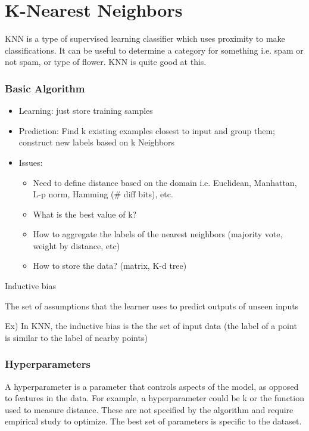 \chapter{K-Nearest Neighbors}
 KNN is a type of supervised learning classifier which uses proximity to make classifications. It can be useful to determine a category for something i.e. spam or not spam, or type of flower. KNN is quite good at this.

 \subsection*{Basic Algorithm}
\begin{itemize}
    \item Learning: just store training samples
    \item Prediction: Find k existing examples closest to input and group them; construct new labels based on k Neighbors
    \item Issues:
    \begin{itemize}
        \item Need to define distance based on the domain i.e. Euclidean, Manhattan, L-p norm, Hamming (\# diff bits), etc.
        \item What is the best value of k?
        \item How to aggregate the labels of the nearest neighbors (majority vote, weight by distance, etc)
        \item How to store the data? (matrix, K-d tree)
    \end{itemize}
\end{itemize}

\begin{definition}
    Inductive bias

    The set of assumptions that the learner uses to predict outputs of unseen inputs

    Ex) In KNN, the inductive bias is the the set of input data (the label of a point is similar to the label of nearby points)
\end{definition}

\subsection*{Hyperparameters}
A hyperparameter is a parameter that controls aspects of the model, as opposed to features in the data. For example, a hyperparameter could be k or the function used to measure distance. These are not specified by the algorithm and require empirical study to optimize. The best set of parameters is specific to the dataset.


